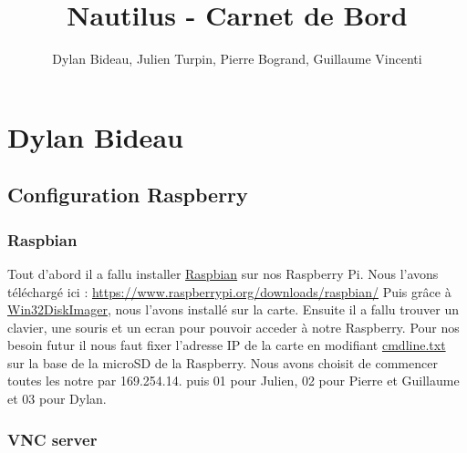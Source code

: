 \documentclass[a4paper,11pt]{report}
\author{Dylan Bideau, Julien Turpin, Pierre Bogrand, Guillaume Vincenti}
\title{Nautilus - Carnet de Bord}
\begin{document}
\maketitle

\renewcommand{\contentsname}{Sommaire}
\tableofcontents


\chapter{Dylan Bideau}
	\section{Configuration Raspberry}
		\subsection{Raspbian}
			Tout d'abord il a fallu installer \underline{Raspbian} sur nos Raspberry Pi. \newline
			Nous l'avons téléchargé ici :\newline
			\url{https://www.raspberrypi.org/downloads/raspbian/}
			\newline Puis grâce à \underline{Win32DiskImager}, nous l'avons installé sur la carte. Ensuite il a fallu trouver un clavier, une souris et un ecran pour pouvoir acceder à notre Raspberry. Pour nos besoin futur il nous faut fixer l'adresse IP de la carte en modifiant \underline{cmdline.txt} sur la base de la microSD de la Raspberry. Nous avons choisit de commencer toutes les notre par 169.254.14. puis 01 pour Julien, 02 pour Pierre et Guillaume et 03 pour Dylan.
			
		\subsection{VNC server}
\end{document}
